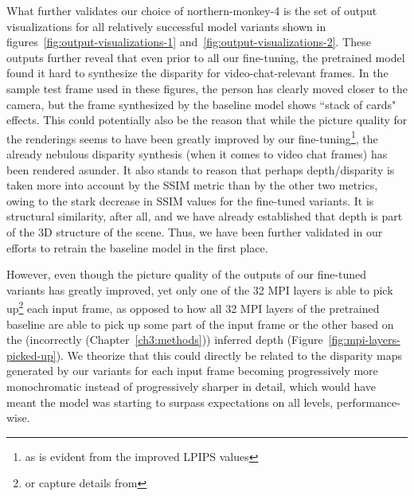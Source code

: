 What further validates our choice of northern-monkey-4 is the set of output visualizations for all relatively successful model variants shown in figures~\ref{fig:output-visualizations-1} and~\ref{fig:output-visualizations-2}. These outputs further reveal that even prior to all our fine-tuning, the pretrained model found it hard to synthesize the disparity for video-chat-relevant frames. In the sample test frame used in these figures, the person has clearly moved closer to the camera, but the frame synthesized by the baseline model shows ``stack of cards" effects. This could potentially also be the reason that while the picture quality for the renderings seems to have been greatly improved by our fine-tuning\footnote{as is evident from the improved LPIPS values}, the already nebulous disparity synthesis (when it comes to video chat frames) has been rendered asunder. It also stands to reason that perhaps depth/disparity is taken more into account by the SSIM metric than by the other two metrics, owing to the stark decrease in SSIM values for the fine-tuned variants. It is structural similarity, after all, and we have already established that depth is part of the 3D structure of the scene. Thus, we have been further validated in our efforts to retrain the baseline model in the first place.

However, even though the picture quality of the outputs of our fine-tuned variants has greatly improved, yet only one of the 32 MPI layers is able to pick up\footnote{or capture details from} each input frame, as opposed to how all 32 MPI layers of the pretrained baseline are able to pick up some part of the input frame or the other based on the (incorrectly (Chapter~\ref{ch3:methods})) inferred depth (Figure~\ref{fig:mpi-layers-picked-up}). We theorize that this could directly be related to the disparity maps generated by our variants for each input frame becoming progressively more monochromatic instead of progressively sharper in detail, which would have meant the model was starting to surpass expectations on all levels, performance-wise. 


